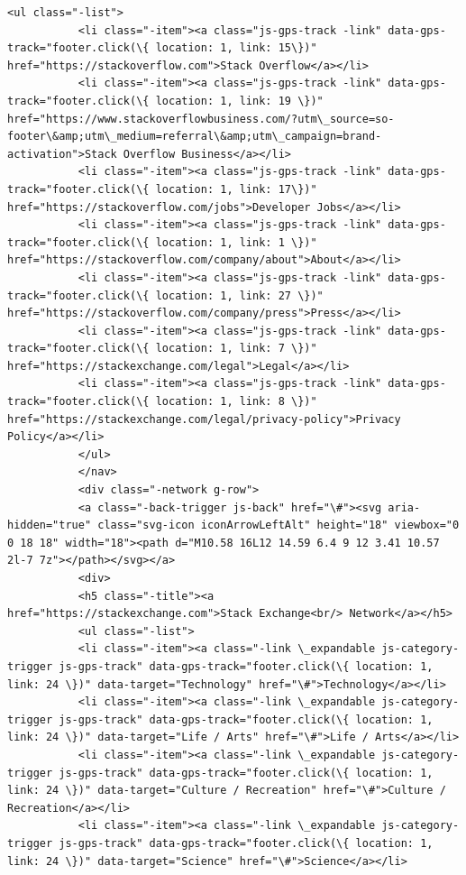 \documentclass[11pt]{article}
\begin{document}
\begin{Verbatim}[commandchars=\\\{\}]
           <ul class="-list">
           <li class="-item"><a class="js-gps-track -link" data-gps-track="footer.click(\{ location: 1, link: 15\})" href="https://stackoverflow.com">Stack Overflow</a></li>
           <li class="-item"><a class="js-gps-track -link" data-gps-track="footer.click(\{ location: 1, link: 19 \})" href="https://www.stackoverflowbusiness.com/?utm\_source=so-footer\&amp;utm\_medium=referral\&amp;utm\_campaign=brand-activation">Stack Overflow Business</a></li>
           <li class="-item"><a class="js-gps-track -link" data-gps-track="footer.click(\{ location: 1, link: 17\})" href="https://stackoverflow.com/jobs">Developer Jobs</a></li>
           <li class="-item"><a class="js-gps-track -link" data-gps-track="footer.click(\{ location: 1, link: 1 \})" href="https://stackoverflow.com/company/about">About</a></li>
           <li class="-item"><a class="js-gps-track -link" data-gps-track="footer.click(\{ location: 1, link: 27 \})" href="https://stackoverflow.com/company/press">Press</a></li>
           <li class="-item"><a class="js-gps-track -link" data-gps-track="footer.click(\{ location: 1, link: 7 \})" href="https://stackexchange.com/legal">Legal</a></li>
           <li class="-item"><a class="js-gps-track -link" data-gps-track="footer.click(\{ location: 1, link: 8 \})" href="https://stackexchange.com/legal/privacy-policy">Privacy Policy</a></li>
           </ul>
           </nav>
           <div class="-network g-row">
           <a class="-back-trigger js-back" href="\#"><svg aria-hidden="true" class="svg-icon iconArrowLeftAlt" height="18" viewbox="0 0 18 18" width="18"><path d="M10.58 16L12 14.59 6.4 9 12 3.41 10.57 2l-7 7z"></path></svg></a>
           <div>
           <h5 class="-title"><a href="https://stackexchange.com">Stack Exchange<br/> Network</a></h5>
           <ul class="-list">
           <li class="-item"><a class="-link \_expandable js-category-trigger js-gps-track" data-gps-track="footer.click(\{ location: 1, link: 24 \})" data-target="Technology" href="\#">Technology</a></li>
           <li class="-item"><a class="-link \_expandable js-category-trigger js-gps-track" data-gps-track="footer.click(\{ location: 1, link: 24 \})" data-target="Life / Arts" href="\#">Life / Arts</a></li>
           <li class="-item"><a class="-link \_expandable js-category-trigger js-gps-track" data-gps-track="footer.click(\{ location: 1, link: 24 \})" data-target="Culture / Recreation" href="\#">Culture / Recreation</a></li>
           <li class="-item"><a class="-link \_expandable js-category-trigger js-gps-track" data-gps-track="footer.click(\{ location: 1, link: 24 \})" data-target="Science" href="\#">Science</a></li>

\end{Verbatim}
\end{document}
